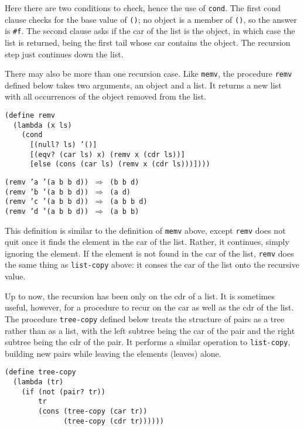 Here there are two conditions to check, hence the use of \label{start_s142}\texttt{cond}.
The first cond clause checks for the base value of \texttt{()}; no object is a
member of \texttt{()}, so the answer is \texttt{\#{}f}.
The second clause asks if the car of the list is the object, in which
case the list is returned, being the first tail whose car contains
the object.
The recursion step just continues down the list.


There may also be more than one recursion case.
Like \texttt{memv}, the procedure \label{start_s143}\texttt{remv} defined below takes two
arguments, an object and a list.
It returns a new list with all occurrences of the object removed from
the list.


\begin{alltt}
(define remv
  (lambda (x ls)
    (cond
      [(null? ls) '()]
      [(eqv? (car ls) x) (remv x (cdr ls))]
      [else (cons (car ls) (remv x (cdr ls)))])))
\end{alltt}


\begin{alltt}
(remv 'a '(a b b d)) \(\Rightarrow\) (b b d)
(remv 'b '(a b b d)) \(\Rightarrow\) (a d)
(remv 'c '(a b b d)) \(\Rightarrow\) (a b b d)
(remv 'd '(a b b d)) \(\Rightarrow\) (a b b)
\end{alltt}


This definition is similar to the definition of \texttt{memv} above,
except \texttt{remv} does not quit once it finds the element in the car
of the list.
Rather, it continues, simply ignoring the element.
If the element is not found in the car of the list, \texttt{remv} does
the same thing as \texttt{list-copy} above: it conses the car of the list
onto the recursive value.


Up to now, the recursion has been only on the cdr of a list.
It is sometimes useful, however, for a procedure to recur on
the car as well as the cdr of the list.
The procedure \label{start_s144}\texttt{tree-copy} defined below
treats the structure of pairs as a tree
rather than as a list, with the left subtree being the car of the pair and
the right subtree being the cdr of the pair.
It performs a similar operation to \texttt{list-copy}, building new pairs
while leaving the elements (leaves) alone.


\begin{alltt}
(define tree-copy
  (lambda (tr)
    (if (not (pair? tr))
        tr
        (cons (tree-copy (car tr))
              (tree-copy (cdr tr))))))
\end{alltt}


